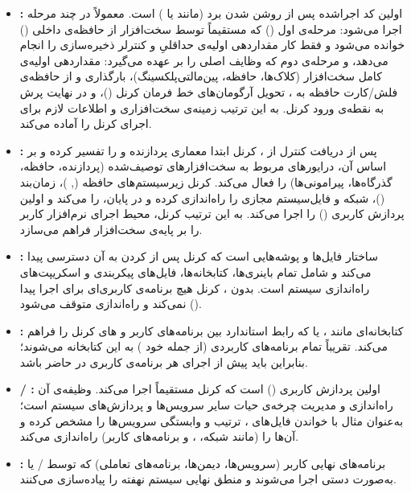 \begin{itemize}
	\item \textbf{:} اولین کد اجراشده پس از روشن شدن برد (مانند  یا ) است.  معمولاً در چند مرحله اجرا می‌شود: مرحله‌ی اول () که مستقیماً توسط سخت‌افزار از حافظه‌ی داخلی () خوانده می‌شود و فقط کار مقداردهی اولیه‌ی حداقلیِ  و کنترلر ذخیره‌سازی را انجام می‌دهد، و مرحله‌ی دوم که وظایف اصلی را بر عهده می‌گیرد: مقداردهی اولیه‌ی کامل سخت‌افزار (کلاک‌ها، حافظه، پین‌مالتی‌پلکسینگ)، بارگذاری  و  از حافظه‌ی فلش/کارت حافظه به ، تحویل آرگومان‌های خط فرمان کرنل ()، و در نهایت پرش به نقطه‌ی ورود کرنل. به این ترتیب  زمینه‌ی سخت‌افزاری و اطلاعات لازم برای اجرای کرنل را آماده می‌کند.

	\item \textbf{:} پس از دریافت کنترل از ، کرنل ابتدا معماری پردازنده و  را تفسیر کرده و بر اساس آن، درایورهای مربوط به سخت‌افزارهای توصیف‌شده (پردازنده، حافظه، گذرگاه‌ها، پیرامونی‌ها) را فعال می‌کند. کرنل زیرسیستم‌های حافظه (, )، زمان‌بند ()، شبکه و فایل‌سیستم مجازی را راه‌اندازی کرده و در پایان،  را  می‌کند و اولین پردازش کاربری () را اجرا می‌کند. به این ترتیب کرنل، محیط اجرای نرم‌افزار کاربر را بر پایه‌ی سخت‌افزار فراهم می‌سازد.

	\item \textbf{:} ساختار فایل‌ها و پوشه‌هایی است که کرنل پس از  کردن به آن دسترسی پیدا می‌کند و شامل تمام باینری‌ها، کتابخانه‌ها، فایل‌های پیکربندی و اسکریپت‌های راه‌اندازی سیستم است. بدون ، کرنل هیچ برنامه‌ی کاربری‌ای برای اجرا پیدا نمی‌کند و راه‌اندازی متوقف می‌شود ().

	\item \textbf{:} کتابخانه‌ای مانند ،  یا  که رابط استاندارد بین برنامه‌های کاربر و های کرنل را فراهم می‌کند. تقریباً تمام برنامه‌های کاربردی (از جمله خود ) به این کتابخانه  می‌شوند؛ بنابراین  باید پیش از اجرای هر برنامه‌ی کاربری در  حاضر باشد.

	\item \textbf{ / :} اولین پردازش کاربری () است که کرنل مستقیماً اجرا می‌کند. وظیفه‌ی آن راه‌اندازی و مدیریت چرخه‌ی حیات سایر سرویس‌ها و پردازش‌های سیستم است؛ به‌عنوان مثال  با خواندن فایل‌های ، ترتیب و وابستگی سرویس‌ها را مشخص کرده و آن‌ها را (مانند شبکه، ، و برنامه‌های کاربر) راه‌اندازی می‌کند.

	\item \textbf{:} برنامه‌های نهایی کاربر (سرویس‌ها، دیمن‌ها، برنامه‌های تعاملی) که توسط / یا به‌صورت دستی اجرا می‌شوند و منطق نهایی سیستم نهفته را پیاده‌سازی می‌کنند.
\end{itemize}

